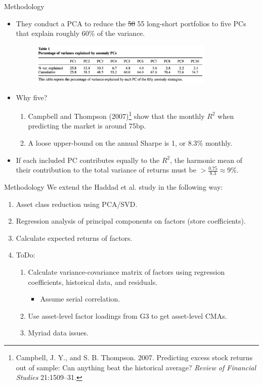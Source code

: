 \documentclass[dvipsnames,mathserif, handout]{beamer}
\begin{document}
{\begin{frame}{Methodology}
	\begin{itemize}
		\item They conduct a PCA to reduce the \sout{50} 55 long-short portfolios to five PCs that explain roughly 60\% of the variance.
		\begin{figure}[!ht]
		\centering
			\includegraphics[width=250pt]{Table1.pdf}
		\end{figure}
		\item Why five? 
		\begin{enumerate}
			\item Campbell and Thompson (2007)\footnote{\tiny Campbell, J. Y., and S. B. Thompson. 2007. Predicting excess stock returns out of sample: Can anything beat the historical average? \textit{Review of Financial Studies} 21:1509–31.} show that the monthly $R^2$ when predicting the market is around 75bp.
			\item A loose upper-bound on the annual Sharpe is 1, or 8.3\% monthly. 
		\end{enumerate}
		\item If each included PC contributes equally to the $R^2$, the harmonic mean of their contribution to the total variance of returns must be $> \frac{0.75}{8.3} \approx 9\%$.
	\end{itemize}
\end{frame} 

\begin{frame}{Methodology}
	We extend the Haddad et al. study in the following way:
	\begin{enumerate}
		\item Asset class reduction using PCA/SVD.
		\item Regression analysis of principal components on factors (store coefficients).
		\item Calculate expected returns of factors.
		\item ToDo:
		\begin{enumerate}
			\item Calculate variance-covariance matrix of factors using regression coefficients, historical data, and residuals.
			\begin{itemize}
				\item Assume serial correlation.
			\end{itemize}
			\item Use asset-level factor loadings from G3 to get asset-level CMAs.
			\item Myriad data issues.
		\end{enumerate}
	\end{enumerate}
\end{frame}

}
\end{document}
